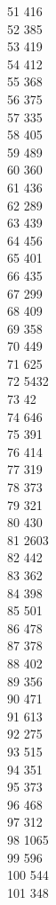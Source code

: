 { 51	416 \\
 52	385 \\
 53	419 \\
 54	412 \\
 55	368 \\
 56	375 \\
 57	335 \\
 58	405 \\
 59	489 \\
 60	360 \\
 61	436 \\
 62	289 \\
 63	439 \\
 64	456 \\
 65	401 \\
 66	435 \\
 67	299 \\
 68	409 \\
 69	358 \\
 70	449 \\
 71	625 \\
 72	5432 \\
 73	42 \\
 74	646 \\
 75	391 \\
 76	414 \\
 77	319 \\
 78	373 \\
 79	321 \\
 80	430 \\
 81	2603 \\
 82	442 \\
 83	362 \\
 84	398 \\
 85	501 \\
 86	478 \\
 87	378 \\
 88	402 \\
 89	356 \\
 90	471 \\
 91	613 \\
 92	275 \\
 93	515 \\
 94	351 \\
 95	373 \\
 96	468 \\
 97	312 \\
 98	1065 \\
 99	596 \\
 100	544 \\
 101	348 \\
}
